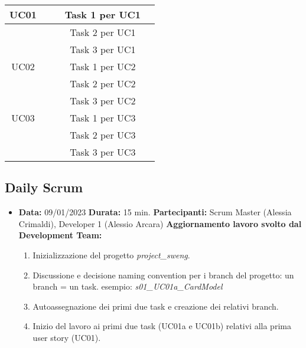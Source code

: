 \documentclass{article}
\begin{document}
\begin{itemize}
\begin{tabular}{ |c|c|c|c|c| }
            \hline
            UC01           &                     &               &   Task 1 per UC1   &               \\
            \hline
                           &                     &               &   Task 2 per UC1   &               \\
            \hline
                           &                     &               &   Task 3 per UC1   &               \\
            \hline
            UC02           &                     &               &   Task 1 per UC2   &               \\
            \hline
                           &                     &               &   Task 2 per UC2   &               \\
            \hline
                           &                     &               &   Task 3 per UC2   &               \\
            \hline
            UC03           &                     &               &   Task 1 per UC3   &               \\
            \hline
                           &                     &               &   Task 2 per UC3   &               \\
            \hline
                           &                     &               &   Task 3 per UC3   &               \\
            \hline
        \end{tabular}
    \end{itemize}

    \subsection{Daily Scrum}
    \begin{itemize}
        \item \textbf{Data:} 09/01/2023
        \newline \textbf{Durata:} 15 min.
        \newline \textbf{Partecipanti:} Scrum Master (Alessia Crimaldi), Developer 1 (Alessio Arcara)
        \newline
        \newline \textbf{Aggiornamento lavoro svolto dal Development Team:}
        \begin{enumerate}
            \item Inizializzazione del progetto \textit{project\_sweng}.
            \item Discussione e decisione naming convention per i branch del progetto: un branch = un task.
            \newline esempio: \textit{s01\_UC01a\_CardModel}
            \item Autoassegnazione dei primi due task e creazione dei relativi branch.
            \item Inizio del lavoro ai primi due task (UC01a e UC01b) relativi alla prima user story (UC01).
        \end{enumerate}
    \end{itemize}
\end{document}
